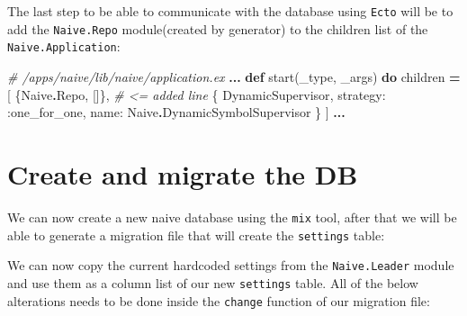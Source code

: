\documentclass[
  oneside]{book}
\newenvironment{Shaded}{\begin{snugshade}}{\end{snugshade}}
\newcommand{\AttributeTok}[1]{\textcolor[rgb]{0.77,0.63,0.00}{#1}}
\newcommand{\CommentTok}[1]{\textcolor[rgb]{0.56,0.35,0.01}{\textit{#1}}}
\newcommand{\ConstantTok}[1]{\textcolor[rgb]{0.00,0.00,0.00}{#1}}
\newcommand{\ExtensionTok}[1]{#1}
\newcommand{\KeywordTok}[1]{\textcolor[rgb]{0.13,0.29,0.53}{\textbf{#1}}}
\newcommand{\NormalTok}[1]{#1}
\newcommand{\OperatorTok}[1]{\textcolor[rgb]{0.81,0.36,0.00}{\textbf{#1}}}
\newcommand{\VariableTok}[1]{\textcolor[rgb]{0.00,0.00,0.00}{#1}}
\begin{document}
The last step to be able to communicate with the database using \texttt{Ecto} will be to add the \texttt{Naive.Repo} module(created by generator) to the children list of the \texttt{Naive.Application}:

\begin{Shaded}
\begin{Highlighting}[]
\CommentTok{\# /apps/naive/lib/naive/application.ex}
\OperatorTok{...}
  \KeywordTok{def}\NormalTok{ start(\_type, \_args) }\KeywordTok{do}
\NormalTok{    children }\OperatorTok{=}\NormalTok{ [}
\NormalTok{      \{}\ConstantTok{Naive}\OperatorTok{.}\ConstantTok{Repo}\NormalTok{, []\}, }\CommentTok{\# \textless{}= added line}
\NormalTok{      \{}
        \ConstantTok{DynamicSupervisor}\NormalTok{,}
        \VariableTok{strategy:} \VariableTok{:one\_for\_one}\NormalTok{, }\VariableTok{name:} \ConstantTok{Naive}\OperatorTok{.}\ConstantTok{DynamicSymbolSupervisor}
\NormalTok{      \}}
\NormalTok{    ]}
    \OperatorTok{...}
\end{Highlighting}
\end{Shaded}

\hypertarget{create-and-migrate-the-db}{%
\section{Create and migrate the DB}\label{create-and-migrate-the-db}}

We can now create a new naive database using the \texttt{mix} tool, after that we will be able to generate a migration file that will create the \texttt{settings} table:

\begin{Shaded}
\end{Shaded}

We can now copy the current hardcoded settings from the \texttt{Naive.Leader} module and use them as a column list of our new \texttt{settings} table. All of the below alterations needs to be done inside the \texttt{change} function of our migration file:
\end{document}
